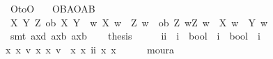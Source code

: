 \begin{isabellebody}
\endisatagproof
{\isafoldproof}%
%
\isadelimproof
\isanewline
%
\endisadelimproof
\isanewline
{}\isamarkupfalse%
\ O{\isacharunderscore}to{\isacharunderscore}O{\isacharcolon}\isanewline
\ \ \ {\isachardoublequoteopen}{\isasymTurnstile}{\isacharparenleft}O{\isacharbraceleft}B{\isacharbar}A{\isacharbraceright}\isactrlbold {\isasymrightarrow}O{\isacharbraceleft}{\isacharparenleft}A\isactrlbold {\isasymrightarrow}B{\isacharparenright}{\isacharbar}\isactrlbold {\isasymtop}{\isacharbraceright}{\isacharparenright}{\isachardoublequoteclose}\isanewline
%
\isadelimproof
%
\endisadelimproof
%
\isatagproof
{}\isamarkupfalse%
{\isacharminus}\isanewline
\ \ \isamarkupfalse%
\ {\isachardoublequoteopen}{\isasymforall}X\ Y\ Z{\isachardot}\ {\isacharparenleft}ob\ X\ Y\ {\isasymand}\ {\isacharparenleft}{\isasymforall}w{\isachardot}\ X\ w\ {\isasymlongrightarrow}\ Z\ w{\isacharparenright}{\isacharparenright}\ {\isasymlongrightarrow}\ ob\ Z\ {\isacharparenleft}{\isasymlambda}w{\isachardot}{\isacharparenleft}Z\ w\ {\isasymand}\ {\isasymnot}X\ w{\isacharparenright}\ {\isasymor}\ Y\ w{\isacharparenright}{\isachardoublequoteclose}\isanewline
\ \ \isamarkupfalse%
\ {\isacharparenleft}smt\ ax{\isacharunderscore}{}d\ ax{\isacharunderscore}{}b\ ax{\isacharunderscore}{}b{\isacharprime}{\isacharprime}{\isacharparenright}\isanewline
\ \ \isamarkupfalse%
\ {\isacharquery}thesis\isanewline
{}\isamarkupfalse%
\ {\isacharminus}\isanewline
\ \ \isamarkupfalse%
\ ii\ {\isacharcolon}{\isacharcolon}\ {\isachardoublequoteopen}{\isacharparenleft}i\ {\isasymRightarrow}\ bool{\isacharparenright}\ {\isasymRightarrow}\ {\isacharparenleft}i\ {\isasymRightarrow}\ bool{\isacharparenright}\ {\isasymRightarrow}\ i{\isachardoublequoteclose}\ \isanewline
{\isachardoublequoteopen}{\isasymforall}x{}\ x{}{\isachardot}\ {\isacharparenleft}{\isasymexists}v{}{\isachardot}\ {\isacharparenleft}x{}\isactrlbold {\isasymand}{\isacharparenleft}\isactrlbold {\isasymnot}\ x{}{\isacharparenright}{\isacharparenright}\ v{}{\isacharparenright}\ {\isacharequal}\ x{}\isactrlbold {\isasymand}{\isacharparenleft}\isactrlbold {\isasymnot}\ x{}{\isacharparenright}\ {\isacharparenleft}ii\ x{}\ x{}{\isacharparenright}{\isachardoublequoteclose}\isanewline
\ \ \ \ \isamarkupfalse%
\ moura\isanewline
\ \ \isamarkupfalse%

\end{isabellebody}
